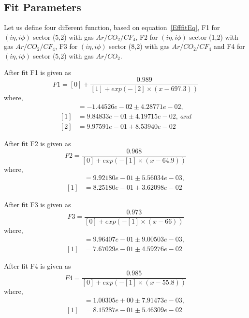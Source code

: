\subsection{Fit Parameters} %
\label{sub:fit_parameters}
Let us define four different function, based on equation~\ref{EfffitEq}, F1 for $(i\eta,i\phi)$ sector (5,2) with gas $Ar/CO_2/CF_4$, F2 for $(i\eta,i\phi)$ sector (1,2) with gas $Ar/CO_2/CF_4$, F3 for $(i\eta,i\phi)$ sector (8,2) with gas $Ar/CO_2/CF_4$ and F4 for $(i\eta,i\phi)$ sector (5,2) with gas $Ar/CO_2$.

After fit F1 is given as
\begin{equation}
	F1 = [0] + \frac{0.989}{[1]+exp(-[2]\times(x-697.3))}
\end{equation}
where,
\begin{align*}
[0] &= -1.44526e-02 \pm 4.28771e-02,\\
[1] &= 9.84833e-01 \pm 4.19715e-02,~and \\
[2] &= 9.97591e-01 \pm 8.53940e-02
\end{align*}

After fit F2 is given as
\begin{equation}
	F2 = \frac{0.968}{[0]+exp(-[1]\times(x-64.9))}
\end{equation}
where,
\begin{align*}
[0] &= 9.92180e-01 \pm 5.56034e-03,\\
[1] &= 8.25180e-01 \pm 3.62098e-02
\end{align*} 

After fit F3 is given as
\begin{equation}
	F3 = \frac{0.973}{[0]+exp(-[1]\times(x-66))}
\end{equation}
where,
\begin{align*}
[0] &= 9.96407e-01 \pm 9.00503e-03, \\
[1] &= 7.67029e-01 \pm 4.59276e-02
\end{align*}


After fit F4 is given as
\begin{equation}
	F4 = \frac{0.985}{[0]+exp(-[1]\times(x-55.8))}
\end{equation}
where,
\begin{align*}
[0] &= 1.00305e+00 \pm 7.91473e-03,\\
[1] &= 8.15287e-01 \pm 5.46309e-02
\end{align*}
